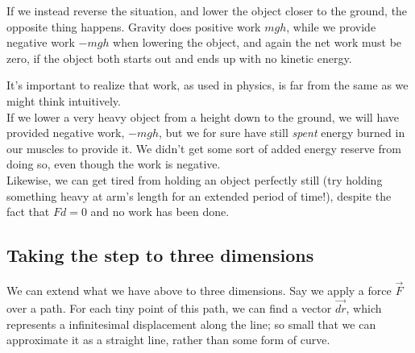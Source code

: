 If we instead reverse the situation, and lower the object closer to the ground, the opposite thing happens. Gravity does positive work $m g h$, while we provide negative work $- m g h$ when lowering the object, and again the net work must be zero, if the object both starts out and ends up with no kinetic energy.

It's important to realize that work, as used in physics, is far from the same as we might think intuitively.\\
If we lower a very heavy object from a height down to the ground, we will have provided negative work, $- m g h$, but we for sure have still \emph{spent} energy burned in our muscles to provide it. We didn't get some sort of added energy reserve from doing so, even though the work is negative.\\
Likewise, we can get tired from holding an object perfectly still (try holding something heavy at arm's length for an extended period of time!), despite the fact that $F d = 0$ and no work has been done.

\subsection{Taking the step to three dimensions}

We can extend what we have above to three dimensions. Say we apply a force $\vec{F}$ over a path. For each tiny point of this path, we can find a vector $\vec{dr}$, which represents a infinitesimal displacement along the line; so small that we can approximate it as a straight line, rather than some form of curve.

\begin{figure}[H]
  \centering
{}
\end{figure}


